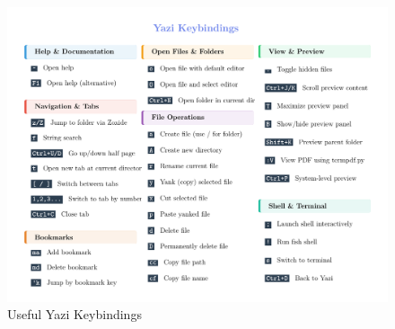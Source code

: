 \documentclass[
  letterpaper,
  DIV=11,
  numbers=noendperiod]{scrartcl}
\begin{document}
\begin{figure}[H]

{\centering \includegraphics[width=1\textwidth,height=\textheight]{cheatsheet/yazi.pdf}

}

\caption{Useful Yazi Keybindings}

\end{figure}%
\end{document}
